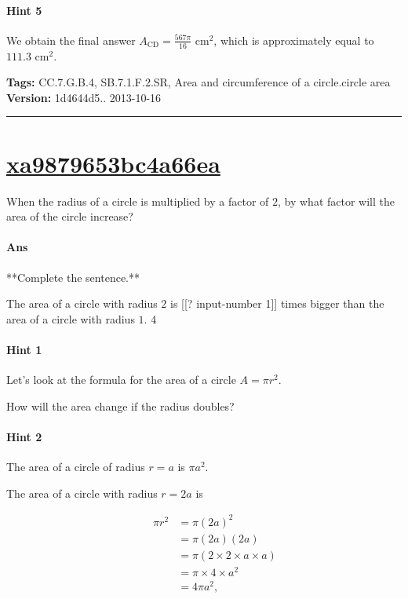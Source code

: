 \documentclass[twocolumn,10pt]{article}
\begin{document}
\paragraph{Hint 5}We obtain the final answer $A_{\text{CD}}=\frac{567\pi}{16}\text{ cm}^2$, which is approximately equal to $111.3\text{ cm}^2$.



\medskip
\noindent
\textbf{Tags:} {\footnotesize CC.7.G.B.4, SB.7.1.F.2.SR, Area and circumference of a circle.circle area}\\
\textbf{Version:} 1d4644d5.. 2013-10-16
\smallskip\hrule





\section{\href{https://www.khanacademy.org/devadmin/content/items/xa9879653bc4a66ea}{xa9879653bc4a66ea}}

\noindent
When the radius of a circle is multiplied by a factor of $2$, by what factor will the area of the circle increase?

\paragraph{Ans} **Complete the sentence.**

The area of a circle with radius $2$ is [[? input-number 1]] times bigger than the area of a circle with radius $1$.
  4

\paragraph{Hint 1}Let's look at the formula for the area of a circle $A=\pi r^2$. 

How will the area change if the radius doubles?

\paragraph{Hint 2}The area of a circle of radius $r=a$ is $\pi a^2$.

The area of a circle with radius $r=2a$ is 

\begin{align*}
\qquad  \pi r^2 & =\pi (2a)^2  \\
  & =\pi(2a)(2a) \\
  &=\pi(2 \times 2 \times a \times a)  \\
   &= \pi \times 4 \times a^2 \\
   &= 4\pi a^2,
\end{align*} 
\end{document}
